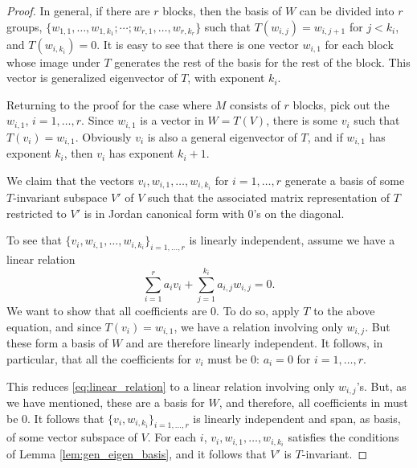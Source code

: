 \begin{proof}
In general, if there are $r$ blocks, then the basis of $W$ can be 
divided into $r$ groups, $\{w_{1,1},\dots,w_{1,k_1};\cdots;w_{r,1},
\dots,w_{r,k_r}\}$ such that $T(w_{i,j}) = w_{i,j + 1}$ for 
$j < k_i$, and $T(w_{i,k_i}) = 0$. It is easy to see that there is
one vector $w_{i, 1}$ for each block whose image under $T$ generates
the rest of the basis for the rest of the block. This vector is 
generalized eigenvector of $T$, with exponent $k_i$.

Returning to the proof for the case where $M$ consists of $r$ 
blocks, pick out the $w_{i,1}$, $i = 1,\dots,r$. Since $w_{i, 1}$
is a vector in $W = T(V)$, there is some $v_i$ such that $T(v_i) 
= w_{i, 1}$. Obviously $v_i$ is also a general eigenvector of $T$,
and if $w_{i, 1}$ has exponent $k_i$, then $v_i$ has exponent
$k_i + 1$. 

We claim that the vectors $v_i, w_{i, 1},\dots, w_{i, k_i}$ for
$i = 1,\dots,r$ generate a basis of some $T$-invariant subspace 
$V'$ of $V$ such that the associated matrix representation of $T$ 
restricted to $V'$ is in Jordan canonical form with $0$'s on the 
diagonal.

To see that $\{v_i,w_{i,1},\dots,w_{i,k_i}\}_{i = 1,\dots,r}$ is
linearly independent, assume we have a linear relation 
\begin{equation}\label{eq:linear_relation}
\sum_{i = 1}^r a_iv_i + \sum_{j = 1}^{k_i} a_{i,j}w_{i,j} = 0.
\end{equation}
We want to show that all coefficients are $0$. To do so, apply
$T$ to the above equation, and since $T(v_i) = w_{i, 1}$, we have
a relation involving only $w_{i, j}$. But these form a basis of
$W$ and are therefore linearly independent. It follows, in 
particular, that all the coefficients for $v_i$ must be $0$:
$a_i = 0$ for $i = 1,\dots,r$.

This reduces \eqref{eq:linear_relation} to a linear relation 
involving only $w_{i,j}$'s. But, as we have mentioned, these are
a basis for $W$, and therefore, all coefficients in must be $0$.
It follows that $\{v_i, w_{i, k_i}\}_{i = 1,\dots,r}$ is linearly
independent and span, as basis, of some vector subspace of $V$.
For each $i$, $v_i,w_{i, 1},\dots,w_{i, k_i}$ satisfies the 
conditions of Lemma \ref{lem:gen_eigen_basis}, and it follows
that $V'$ is $T$-invariant.


\end{proof}
